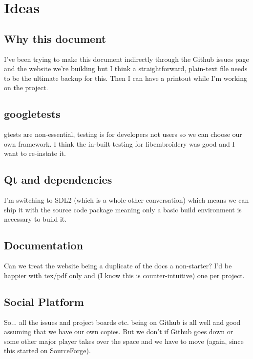 \section{Ideas}

\subsection{Why this document}

I've been trying to make this document indirectly through the Github
issues page and the website we're building but I think a
straightforward, plain-text file needs to be the ultimate backup for
this. Then I can have a printout while I'm working on the project.

\subsection{googletests}

gtests are non-essential, testing is for developers not users so we can
choose our own framework. I think the in-built testing for libembroidery
was good and I want to re-instate it.

\subsection{Qt and dependencies}

I'm switching to SDL2 (which is a whole other conversation) which means
we can ship it with the source code package meaning only a basic build
environment is necessary to build it.

\subsection{Documentation}

Can we treat the website being a duplicate of the docs a non-starter?
I'd be happier with tex/pdf only and (I know this is counter-intuitive)
one per project.

\subsection{Social Platform}

So... all the issues and project boards etc. being on Github is all
well and good assuming that we have our own copies. But we don't if
Github goes down or some other major player takes over the space and we
have to move (again, since this started on SourceForge).

